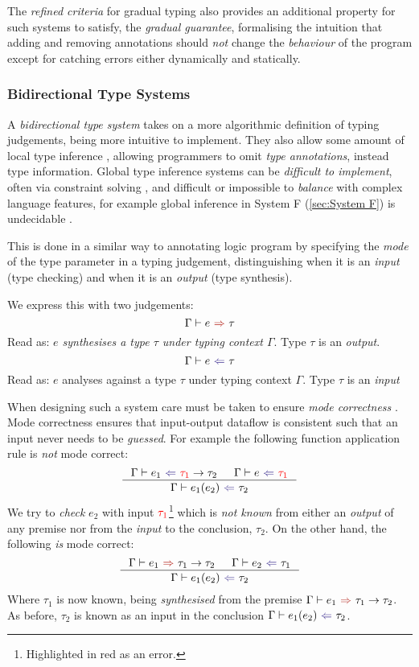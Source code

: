 The \textit{refined criteria} for gradual typing \cite{GradualRefined} also provides an additional property for such systems to satisfy, the \textit{gradual guarantee}, formalising the intuition that adding and removing annotations should \textit{not} change the \textit{behaviour} of the program except for catching errors either dynamically and statically.

\subsubsection{Bidirectional Type Systems}
A \textit{bidirectional type system} \cite{BidirectionalTypes} takes on a more algorithmic definition of typing judgements, being more intuitive to implement. They also allow some amount of local type inference \cite{LocalInference}, allowing programmers to omit \textit{type annotations}, instead type information. Global type inference systems \cite[ch. 22]{TAPL} can be \textit{difficult to implement}, often via constraint solving \cite[ch. 10]{ATTAPL}, and difficult or impossible to \textit{balance} with complex language features, for example global inference in System F (\ref{sec:System F}) is undecidable \cite{SystemFUndecidable}.

This is done in a similar way to annotating logic program by specifying the \textit{mode} \cite[123]{LogicProg} of the type parameter in a typing judgement, distinguishing when it is an \textit{input} (type checking) and when it is an \textit{output} (type synthesis).

We express this with two judgements:
\[\synthesis{e}{\tau}\]
Read as: \textit{$e$ synthesises a type $\tau$ under typing context $\Gamma$}. Type $\tau$ is an \textit{output}.
\[\analysis{e}{\tau}\]
Read as: $e$ analyses against a type $\tau$ under typing context $\Gamma$. Type $\tau$ is an \textit{input}

When designing such a system care must be taken to ensure \textit{mode correctness} \cite{ModeCorrectness}. Mode correctness ensures that input-output dataflow is consistent such that an input never needs to be \textit{guessed}. For example the following function application rule is \textit{not} mode correct:
\[\inference{\analysis{e_1}{{\color{red}\tau_1} \to \tau_2} & \analysis{e}{{\color{red}\tau_1}}}{\analysis{e_1(e_2)}{\tau_2}}\]
We try to \textit{check} $e_2$ with input ${\color{red}\tau_1}$\footnote{Highlighted in red as an error.} which is \textit{not known} from either an \textit{output} of any premise nor from the \textit{input} to the conclusion, $\tau_2$. On the other hand, the following \textit{is} mode correct:
\[\inference{\synthesis{e_1}{\tau_1 \to \tau_2} & \analysis{e_2}{\tau_1}}{\analysis{e_1(e_2)}{\tau_2}}\]
Where $\tau_1$ is now known, being \textit{synthesised} from the premise $\synthesis{e_1}{\tau_1 \to \tau_2}$. As before, $\tau_2$ is known as an input in the conclusion $\analysis{e_1(e_2)}{\tau_2}$.

